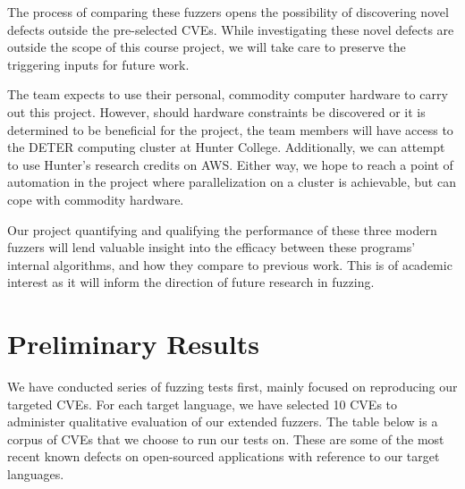 \documentclass[12pt]{diazessay}
\begin{document}
The process of comparing these fuzzers opens the possibility of discovering novel defects outside the pre-selected CVEs.
While investigating these novel defects are outside the scope of this course project, we will take care to preserve the triggering inputs for future work.

The team expects to use their personal, commodity computer hardware to carry out this project.
However, should hardware constraints be discovered or it is determined to be beneficial for the project, the team members will have access to the DETER computing cluster at Hunter College.
Additionally, we can attempt to use Hunter's research credits on AWS.
Either way, we hope to reach a point of automation in the project where parallelization on a cluster is achievable, but can cope with commodity hardware.

Our project quantifying and qualifying the performance of these three modern fuzzers will lend valuable insight into the efficacy between these programs' internal algorithms, and how they compare to previous work.
This is of academic interest as it will inform the direction of future research in fuzzing.


\section*{Preliminary Results}
\label{results}
\vspace{-0.25cm}

We have conducted series of fuzzing tests first, mainly focused on reproducing our targeted CVEs.
For each target language, we have selected 10 CVEs to administer qualitative evaluation of our extended fuzzers.
The table below is a corpus of CVEs that we choose to run our tests on.
These are some of the most recent known defects on open-sourced applications with reference to our target languages.
\end{document}
